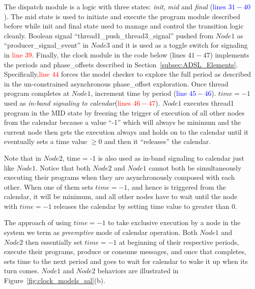 The dispatch module is a logic with three states: \emph{init}, \emph{mid}
and \emph{final} (\textcolor{blue}{lines $31-40$}). The mid state is used to
initiate and execute the program module described before while init and final
state used to manage and control the transition logic cleanly. Boolean signal
“thread1\_push\_thread3\_signal” pushed from $Node1$ as
“producer\_signal\_event” in $Node3$ and it is used as a toggle switch for
signaling in \textcolor{red}{line $39$}. Finally, the clock module in the code
below (lines $41-47$) implements the periods and phase\_offsets described in
Section~\ref{subsec:ADSL_Elements}. Specifically,\textcolor{red}{line $44$}
forces the model checker to explore the full period as described in the
un-constrained asynchronous phase\_offset exploration. Once thread program
completes at $Node1$, increment time by period (\textcolor{blue}{line
$45-46$}). $time = -1$ used as \emph{in-band signaling to
calendar}(\textcolor{red}{lines $46-47$}). $Node1$ executes thread1 program in
the MID state by freezing the trigger of execution of all other nodes from the
calendar because a value “-1” which will always be minimum and the current node
then gets the execution always and holds on to the calendar until it eventually
sets a time value $\geq 0$ and then it “releases” the calendar.

Note that in $Node2$, time = -1 is also used as in-band signaling to calendar
just like $Node1$.  Notice that both $Node2$ and $Node1$ cannot both be
simultaneously executing their programs when they are asynchronously
composed with each other. When one of them sets $time = -1$, and hence is
triggered from the calendar, it will be minimum, and all other nodes have to
wait until the node with $time=-1$ releases the calendar by setting time value
to greater than 0.

The approach of using $time=-1$ to take exclusive execution by a node in the system we term
as \emph{preemptive} mode of calendar operation. Both $Node1$ and $Node2$ then
essentially set $time=-1$  at beginning of their respective periods, execute
their programs, produce or consume messages, and once that completes, sets time to the
next period and goes to wait for calendar to wake it up when its turn
comes. $Node1$ and $Node2$ behaviors are illustrated in
Figure~\ref{fig:clock_models_sal}(b).

